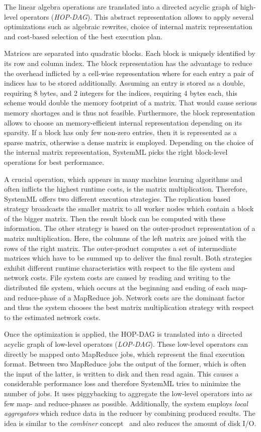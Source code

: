 The linear algebra operations are translated into a directed acyclic graph of high-level operators (\emph{HOP-DAG}).
This abstract representation allows to apply several optimizations such as algebraic rewrites, choice of internal matrix representation and cost-based selection of the best execution plan.

Matrices are separated into quadratic blocks.
Each block is uniquely identified by its row and column index.
The block representation has the advantage to reduce the overhead inflicted by a cell-wise representation where for each entry a pair of indices has to be stored additionally.
Assuming an entry is stored as a double, requiring 8 bytes, and 2 integers for the indices, requiring 4 bytes each, this scheme would double the memory footprint of a matrix.
That would cause serious memory shortages and is thus not feasible.
Furthermore, the block representation allows to choose an memory-efficient internal representation depending on its sparsity.
If a block has only few non-zero entries, then it is represented as a sparse matrix, otherwise a dense matrix is employed.
Depending on the choice of the internal matrix representation, SystemML picks the right block-level operations for best performance.

A crucial operation, which appears in many machine learning algorithms and often inflicts the highest runtime costs, is the matrix multiplication.
Therefore, SystemML offers two different execution strategies.
The replication based strategy broadcasts the smaller matrix to all worker nodes which contain a block of the bigger matrix.
Then the result block can be computed with these information.
The other strategy is based on the outer-product representation of a matrix multiplication.
Here, the columns of the left matrix are joined with the rows of the right matrix.
The outer-product computes a set of intermediate matrices which have to be summed up to deliver the final result.
Both strategies exhibit different runtime characteristics with respect to the file system and network costs.
File system costs are caused by reading and writing to the distributed file system, which occurs at the beginning and ending of each map- and reduce-phase of a MapReduce job.
Network costs are the dominant factor and thus the system chooses the best matrix multiplication strategy with respect to the estimated network costs.

Once the optimization is applied, the HOP-DAG is translated into a directed acyclic graph of low-level operators (\emph{LOP-DAG}).
These low-level operators can directly be mapped onto MapReduce jobs, which represent the final execution format.
Between two MapReduce jobs the output of the former, which is often the input of the latter, is written to disk and then read again.
This causes a considerable performance loss and therefore SystemML tries to minimize the number of jobs.
It uses piggybacking to aggregate the low-level operators into as few map- and reduce-phases as possible.
Additionally, the system employs \emph{local aggregators} which reduce data in the reducer by combining produced results.
The idea is similar to the \emph{combiner} concept~\cite{dean:c2008a} and also reduces the amount of disk I/O.

